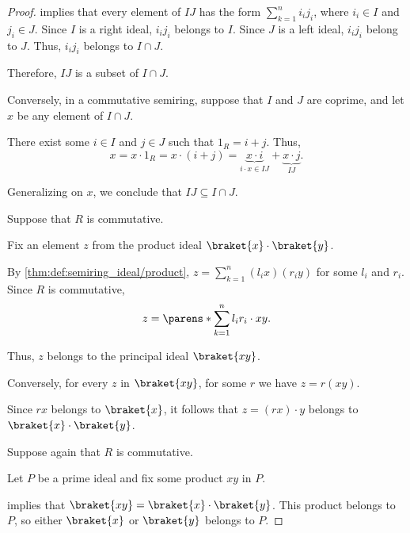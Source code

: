 \begin{proof}
   implies that every element of \( IJ \) has the form \( \sum_{k=1}^n i_i j_i \), where \( i_i \in I \) and \( j_i \in J \). Since \( I \) is a right ideal, \( i_i j_i \) belongs to \( I \). Since \( J \) is a left ideal, \( i_i j_i \) belong to \( J \). Thus, \( i_i j_i \) belongs to \( I \cap J \).

  Therefore, \( IJ \) is a subset of \( I \cap J \).

  \NecessitySubProof* Conversely, in a commutative semiring, suppose that \( I \) and \( J \) are coprime, and let \( x \) be any element of \( I \cap J \).

  There exist some \( i \in I \) and \( j \in J \) such that \( 1_R = i + j \). Thus,
  \begin{equation*}
    x = x \cdot 1_R = x \cdot (i + j) = \underbrace{x \cdot i}_{i \cdot x \in IJ} + \underbrace{x \cdot j}_{IJ}.
  \end{equation*}

  Generalizing on \( x \), we conclude that \( IJ \subseteq I \cap J \).

   Suppose that \( R \) is commutative.

  \SufficiencySubProof* Fix an element \( z \) from the product ideal \( \braket{x} \cdot \braket{y} \).

  By \cref{thm:def:semiring_ideal/product}, \( z = \sum_{k=1}^n (l_i x) (r_i y) \) for some \( l_i \) and \( r_i \). Since \( R \) is commutative,
  \begin{equation*}
    z = \parens*{ \sum_{k=1}^n l_i r_i } \cdot xy.
  \end{equation*}

  Thus, \( z \) belongs to the principal ideal \( \braket{ xy } \).

  \NecessitySubProof* Conversely, for every \( z \) in \( \braket{ xy } \), for some \( r \) we have \( z = r(xy) \).

  Since \( rx \) belongs to \( \braket{ x } \), it follows that \( z = (rx) \cdot y \) belongs to \( \braket{ x } \cdot \braket{ y } \).

   Suppose again that \( R \) is commutative.

  \SufficiencySubProof* Let \( P \) be a prime ideal and fix some product \( xy \) in \( P \).

   implies that \( \braket{ xy } = \braket{ x } \cdot \braket{ y } \). This product belongs to \( P \), so either \( \braket{ x } \) or \( \braket{ y } \) belongs to \( P \).


\end{proof}
